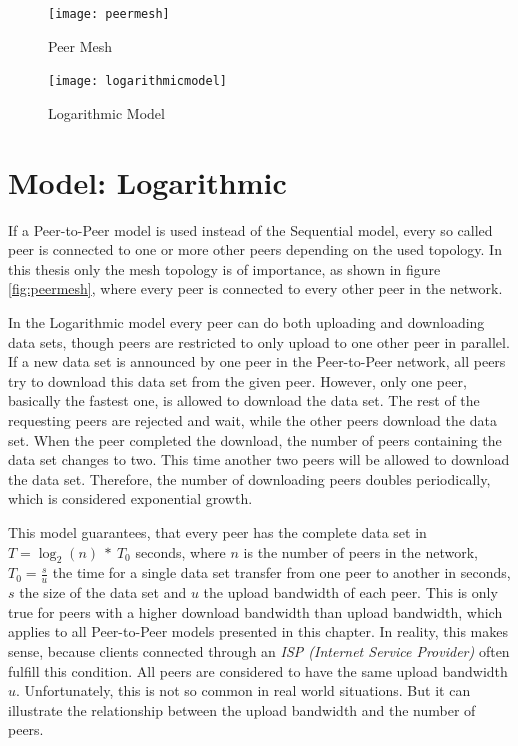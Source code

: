 \begin{figure} [t]
	\centering
	\begin{minipage}[b]{0.4\linewidth}
		\texttt{[image: peermesh]}
		\caption{Peer Mesh}
		\label{fig:peermesh}
	\end{minipage}
	\hspace{0.1\linewidth}
	\begin{minipage}[b]{0.4\linewidth}
		\texttt{[image: logarithmicmodel]}
		\caption{Logarithmic Model}
		\label{fig:logarithmicmodel}
	\end{minipage}
\end{figure}

\section{Model: Logarithmic}
\label{theory:model:logarithmic}

If a Peer-to-Peer model is used instead of the Sequential model, every so called peer is connected to one or more other peers depending on the used topology. In this thesis only the mesh topology is of importance, as shown in figure \ref{fig:peermesh}, where every peer is connected to every other peer in the network.

In the Logarithmic model every peer can do both uploading and downloading data sets, though peers are restricted to only upload to one other peer in parallel. If a new data set is announced by one peer in the Peer-to-Peer network, all peers try to download this data set from the given peer. However, only one peer, basically the fastest one, is allowed to download the data set. The rest of the requesting peers are rejected and wait, while the other peers download the data set. When the peer completed the download, the number of peers containing the data set changes to two. This time another two peers will be allowed to download the data set. Therefore, the number of downloading peers doubles periodically, which is considered exponential growth.

This model guarantees, that every peer has the complete data set in $T=\log_{2}{(n)}\:*\:T_0$  seconds, where $n$ is the number of peers in the network, $T_0=\frac{s}{u}$ the time for a single data set transfer from one peer to another in seconds, $s$ the size of the data set and $u$ the upload bandwidth of each peer. This is only true for peers with a higher download bandwidth than upload bandwidth, which applies to all Peer-to-Peer models presented in this chapter. In reality, this makes sense, because clients connected through an \emph{ISP (Internet Service Provider)} often fulfill this condition. All peers are considered to have the same upload bandwidth $u$. Unfortunately, this is not so common in real world situations. But it can illustrate the relationship between the upload bandwidth and the number of peers. 

